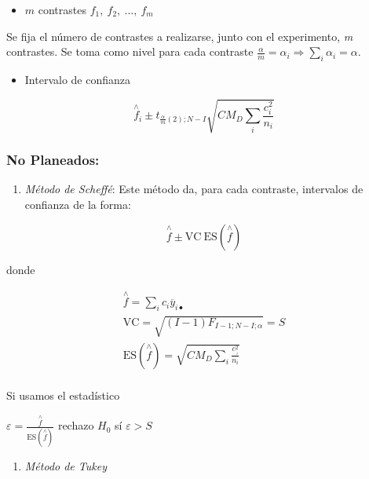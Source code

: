 \documentclass[]{book}
\providecommand{\tightlist}{%
  \setlength{\itemsep}{0pt}\setlength{\parskip}{0pt}}
\theoremstyle{definition}
\theoremstyle{definition}
\theoremstyle{definition}
\theoremstyle{remark}
\begin{document}
\begin{itemize}
\tightlist
\item
  \(m\) contrastes \(f_{1},\ f_{2},\ \ldots,\ f_{m}\)
\end{itemize}

Se fija el número de contrastes a realizarse, junto con el experimento,
\emph{m} contrastes. Se toma como nivel para cada contraste
\(\frac{\alpha}{m} = \alpha_{i} \Rightarrow \sum_{i}^{}\alpha_{i} = \alpha\).

\begin{itemize}
\tightlist
\item
  Intervalo de confianza
\end{itemize}

\[
{\overset{\land}{f}}_{i} \pm t_{\frac{\alpha}{m}(2);N - I}\sqrt{CM_D\sum_{i}^{}\frac{c_{i}^{2}}{n_{i}}}
\]

\hypertarget{no-planeados}{%
\subsubsection{No Planeados:}\label{no-planeados}}

\begin{enumerate}
\def\labelenumi{\arabic{enumi})}
\tightlist
\item
  \emph{Método de Scheffé}: Este método da, para cada contraste,
  intervalos de confianza de la forma:
\end{enumerate}

\[
\overset{\land}{f} \pm \text{VC}\ \text{ES}\left( \overset{\land}{f} \right)
\]

donde

\[
\begin{matrix}
\overset{\land}{f} = \sum_{i}^{}{c_{i}{\overline{y}}_{i\bullet}} \\
\text{VC} = \sqrt{\left( I - 1 \right)F_{I - 1;N - I;\alpha}} = S \\
\text{ES}\left( \overset{\land}{f} \right) = \sqrt{CM_D\sum_{i}^{}\frac{c_{\ _{i}}^{2}}{n_{i}}} \\
\end{matrix}
\]

Si usamos el estadístico

\(\varepsilon = \frac{\overset{\land}{f}}{\text{ES}\left( \overset{\land}{f} \right)}\)
rechazo \(H_{0}\) sí \(\varepsilon > S\)

\begin{enumerate}
\def\labelenumi{\arabic{enumi})}
\setcounter{enumi}{1}
\tightlist
\item
  \emph{Método de Tukey}
\end{enumerate}
\end{document}
